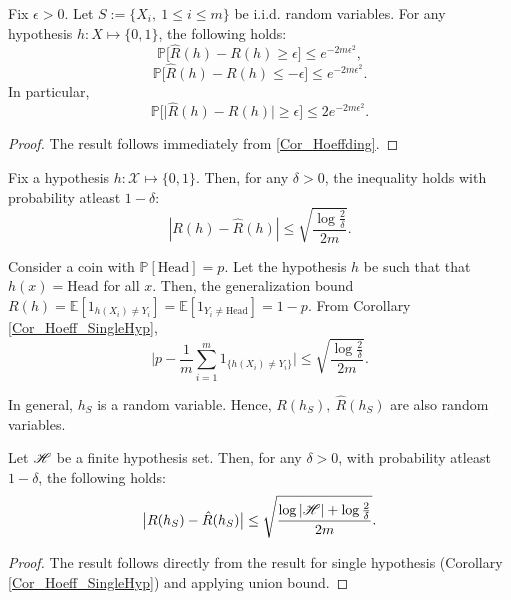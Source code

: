 \documentclass[a4paper,english,12pt]{article}
\begin{document}
\begin{cor}
Fix $\epsilon>0$. Let $S:=\{X_i,~1\leq i\leq m\}$ be i.i.d. random variables. For any hypothesis $h:X\mapsto\{0,1\}$, the following holds:
\begin{equation}
\label{Hoeff_Cor_1}
\mathbb{P}\big[\hat{R}(h)-R(h)\geq \epsilon \big]\leq e^{-2m\epsilon^2}, 
\end{equation}
\begin{equation}
\label{Hoeff_Cor_2}
\mathbb{P}\big[\hat{R}(h)-R(h) \leq -\epsilon \big]\leq e^{-2m\epsilon^2}. 
\end{equation}
In particular, 
\begin{equation}
\label{Hoeff_Cor_3}
\mathbb{P}\big[\big\vert \hat{R}(h)-R(h) \big\vert \geq \epsilon \big]\leq 2e^{-2m\epsilon^2}.
\end{equation}
\end{cor}

\begin{proof}
The result follows immediately from \ref{Cor_Hoeffding}.
\end{proof}

\begin{cor}
\label{Cor_Hoeff_SingleHyp}
Fix a hypothesis $h:\mathcal{X}\mapsto \{0,1\}$. Then, for any $\delta>0$, the inequality holds with probability atleast $1-\delta$: $$|R(h)-\hat{R}(h)|\leq\sqrt{\frac{\log \frac{2}{\delta}}{2m}}.$$ 
\end{cor}

\begin{exmp}
Consider a coin with $\mathbb{P}[\text{Head}]=p$. Let the hypothesis $h$ be such that that $h(x)=\text{Head}$ for all $x$. Then, the generalization bound $R(h)=\mathbb{E}[1_{h(X_i)\neq Y_i}]=\mathbb{E}[1_{Y_i \neq \text{Head}}]=1-p$. From Corollary \ref{Cor_Hoeff_SingleHyp}, $$\Big\vert p-\frac{1}{m}\sum\limits_{i=1}^{m}1_{\{h(X_i)\neq Y_i\}}\Big\vert \leq \sqrt{\frac{\log \frac{2}{\delta}}{2m}}.$$
\end{exmp}

\begin{rem}
In general, $h_S$ is a random variable. Hence, $R(h_S),~\hat{R}(h_S)$ are also random variables.
\end{rem}

\begin{thm}
\label{Th_LearnBnd_Incon}
Let $\mathscr{H}$ be a finite hypothesis set. Then, for any $\delta>0$, with probability atleast $1-\delta$, the following holds: $$\big\vert R(h_S)-\hat{R}(h_S) \big\vert \leq \sqrt{\frac{\log |\mathscr{H}|+\log \frac{2}{\delta}}{2m}}.$$
\end{thm}
\begin{proof}
The result follows directly from the result for single hypothesis (Corollary \ref{Cor_Hoeff_SingleHyp}) and applying union bound. 
\end{proof}
\end{document}
